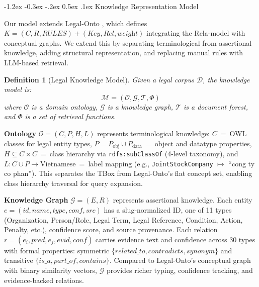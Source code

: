 \documentclass{IOS-Book-Article}
\makeatletter
\newtheorem{definition}{Definition}
\renewcommand\subsection{\@startsection{subsection}{2}{\z@}%
  {-1.2ex \@plus -0.3ex \@minus -.2ex}%
  {0.5ex \@plus .1ex}%
  {\normalfont\normalsize\bfseries}}
\makeatother
\begin{document}
\subsection{Knowledge Representation Model}

Our model extends Legal-Onto \cite{r8}, which defines $K = (C, R, \textit{RULES}) + (\textit{Key}, \textit{Rel}, \textit{weight})$ integrating the Rela-model \cite{r21} with conceptual graphs. We extend this by separating terminological from assertional knowledge, adding structural representation, and replacing manual rules with LLM-based retrieval.

\begin{definition}[Legal Knowledge Model]
Given a legal corpus $\mathcal{D}$, the knowledge model is:
\begin{equation}
\mathcal{M} = (\mathcal{O}, \mathcal{G}, \mathcal{T}, \Phi)
\end{equation}
where $\mathcal{O}$ is a domain ontology, $\mathcal{G}$ is a knowledge graph, $\mathcal{T}$ is a document forest, and $\Phi$ is a set of retrieval functions.
\end{definition}

\textbf{Ontology} $\mathcal{O} = (C, P, H, L)$ represents terminological knowledge: $C$~=~OWL classes for legal entity types, $P = P_\text{obj} \cup P_\text{data}$~=~object and datatype properties, $H \subseteq C \times C$~=~class hierarchy via \texttt{rdfs:subClassOf} (4-level taxonomy), and $L: C \cup P \to \text{Vietnamese}$~=~label mapping (e.g., \texttt{JointStockCompany} $\mapsto$ ``cong ty co phan''). This separates the TBox from Legal-Onto's flat concept set, enabling class hierarchy traversal for query expansion.

\textbf{Knowledge Graph} $\mathcal{G} = (E, R)$ represents assertional knowledge. Each entity $e = (\textit{id}, \textit{name}, \textit{type}, \textit{conf}, \textit{src})$ has a slug-normalized ID, one of 11 types (Organization, Person/Role, Legal Term, Legal Reference, Condition, Action, Penalty, etc.), confidence score, and source provenance. Each relation $r = (e_i, \textit{pred}, e_j, \textit{evid}, \textit{conf})$ carries evidence text and confidence across 30 types with formal properties: symmetric $\{\textit{related\_to}, \textit{contradicts}, \textit{synonym}\}$ and transitive $\{\textit{is\_a}, \textit{part\_of}, \textit{contains}\}$. Compared to Legal-Onto's conceptual graph with binary similarity vectors, $\mathcal{G}$ provides richer typing, confidence tracking, and evidence-backed relations.
\end{document}
